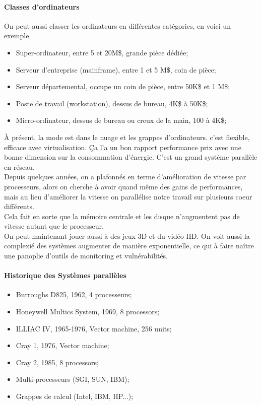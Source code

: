 \documentclass[oneside]{book}
\begin{document}
\paragraph{Classes d'ordinateurs}
On peut aussi classer les ordinateurs en différentes catégories, en voici un exemple.
\begin{itemize}
\item Super-ordinateur, entre 5 et 20M\$, grande pièce dédiée;
\item Serveur d'entreprise (mainframe), entre 1 et 5 M\$, coin de
pièce;
\item Serveur départemental, occupe un coin de pièce, entre
50K\$ et 1 M\$;
\item Poste de travail (workstation), dessus de bureau, 4K\$ à
50K\$;
\item Micro-ordinateur, dessus de bureau ou creux de la main,
100 à 4K\$;
\end{itemize}

À présent, la mode est dans le nuage et les grappes d'ordinateurs. c'est flexible, efficace avec virtualisation. Ça l'a un bon rapport performance prix avec une bonne dimension sur la consommation d'énergie. C'est un grand système parallèle en réseau. \\

Depuis quelques années, on a plafonnés en terme d'amélioration de vitesse par processeurs, alors on cherche à avoir quand même des gains de performances, mais au lieu d'améliorer la vitesse on parallélise notre travail sur plusieurs coeur différents. \\

Cela fait en sorte que la mémoire centrale et les disque n'augmentent pas de vitesse autant que le processeur.\\

On peut maintenant jouer aussi à des jeux 3D et du vidéo HD. On voit aussi la complexié des systèmes augmenter de manière exponentielle, ce qui à faire naître une panoplie d'outils de monitoring et vulnérabilités.

\paragraph{Historique des Systèmes parallèles}
\begin{itemize}
\item Burroughs D825, 1962, 4 processeurs;
\item Honeywell Multics System, 1969, 8 processors;
\item ILLIAC IV, 1965-1976, Vector machine, 256 units;
\item Cray 1, 1976, Vector machine;
\item Cray 2, 1985, 8 processors;
\item Multi-processeurs (SGI, SUN, IBM);
\item Grappes de calcul (Intel, IBM, HP...);
\end{itemize}
\end{document}
